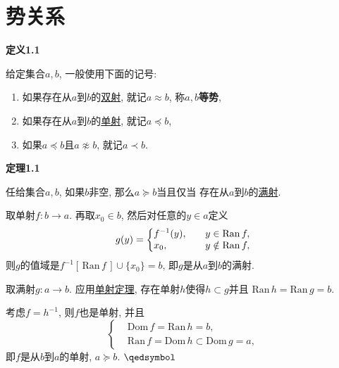 


\setlength{\abovedisplayskip}{1pt}
\setlength{\belowdisplayskip}{1pt}

\section{势关系}

\hypertarget{sec:定义1.1}{}
\noindent\textbf{定义1.1}

给定集合$a,b$, 一般使用下面的记号:
\begin{enumerate}
    \item 如果存在从$a$到$b$的\href{03 映射#nameddest=sec:定义2.2}{双射},
    就记$a\approx b$, 称$a,b$\textbf{等势},
    \item 如果存在从$a$到$b$的\href{03 映射#nameddest=sec:定义2.1}{单射},
    就记$a\preccurlyeq b$,
    \item 如果$a\preccurlyeq b$且$a\not\approx b$,
    就记$a\prec b$.
\end{enumerate}

\vspace{15pt}

\hypertarget{sec:定理1.1}{}
\noindent\textbf{定理1.1}

任给集合$a,b$, 如果$b$非空, 那么$a\succcurlyeq b$当且仅当
存在从$a$到$b$的\href{03 映射#nameddest=sec:定义2.2}{满射}.



取单射$f:b\to a$. 再取$x_0\in b$, 然后对任意的$y\in a$定义
\vspace{3pt}
\[g(y)=\left\{\begin{aligned}
    &f^{-1}(y),\quad&&y\in\mathrm{Ran}\,f,\\[-3pt]
    &x_0,\quad&&y\notin\mathrm{Ran}\,f,
\end{aligned}\right.\\[3pt]\]
则$g$的值域是$f^{-1}[\,\mathrm{Ran}\,f\,]\cup\{x_0\}=b$,
即$g$是从$a$到$b$的满射.


取满射$g:a\to b$. 应用\href{03 映射#nameddest=sec:定理3.2}{单射定理},
存在单射$h$使得$h\subset g$并且
$\mathrm{Ran}\,h=\mathrm{Ran}\,g=b$.

考虑$f=h^{-1}$, 则$f$也是单射, 并且
\[\left\{\begin{aligned}
    &\mathrm{Dom}\,f=\mathrm{Ran}\,h=b,\\[-3pt]
    &\mathrm{Ran}\,f=\mathrm{Dom}\,h\subset\mathrm{Dom}\,g=a,
\end{aligned}\right.\]
即$f$是从$b$到$a$的单射, $a\succcurlyeq b$. \hfill $\qedsymbol$

